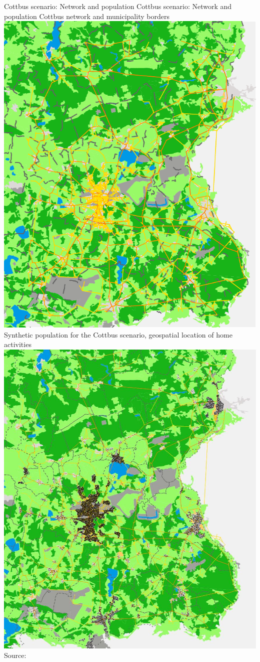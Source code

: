 \createfigure%
{Cottbus scenario: Network and population}%
{Cottbus scenario: Network and population}%
{\label{fig:cottbus_network_population}}%
{%
  \createsubfigure%
	{Cottbus network and municipality borders}
	{\includegraphics[width=0.49\linewidth]{./using/figures/2013_network_gemeinden_landuse_edit.pdf}}
	{\label{fig:network_municipalities_cottbus_landuse}}
  \createsubfigure%
	{Synthetic population for the Cottbus scenario, geospatial location of home activities}
	{\includegraphics[width=0.49\linewidth]{./using/figures/2013_network_gemeinden_landuse_population_home.jpg}}
	{\label{fig:cottbus_population_home}}
}%
{Source:~\citet{Grether2014PhD}} 

